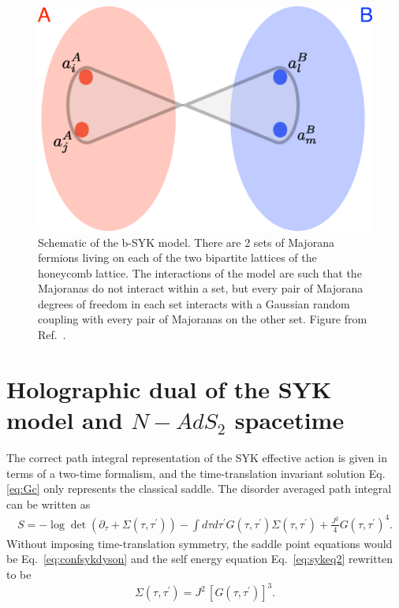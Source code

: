 \begin{figure}
    \centering
    \includegraphics[scale = 0.5]{figures/introduction/bSYK.png}
    \caption{Schematic of the b-SYK model. There are 2 sets of Majorana fermions living on each of the two bipartite lattices of the honeycomb lattice. The interactions of the model are such that the Majoranas do not interact within a set, but every pair of Majorana degrees of freedom in each set interacts with a Gaussian random coupling with every pair of Majoranas on the other set. Figure from Ref.~\cite{Fremling_2022}.}
    \label{fig:bsyk}
\end{figure}



\section{Holographic dual of the SYK model and $N-AdS_2$ spacetime}
The correct path integral representation of the SYK effective action is given in terms of a two-time formalism, and the time-translation invariant solution Eq.\eqref{eq:Gc} only represents the classical saddle. The disorder averaged path integral can be written as
\begin{align}
    S = -\log\det\left(\partial_\tau + \Sigma(\tau,\tau^\prime)\right) - \int d\tau d\tau^\prime G(\tau,\tau^\prime)\Sigma(\tau,\tau^\prime) + \frac{J^2}{4} G(\tau,\tau^\prime)^4.
\end{align}
Without imposing time-translation symmetry, the saddle point equations would be Eq.~\eqref{eq:confsykdyson} and the self energy equation Eq.~\eqref{eq:sykeq2} rewritten to be
\begin{equation}
    \Sigma(\tau,\tau^\prime) = J^2\,\left[G(\tau,\tau^\prime)\right]^3. 
    \label{eq:twotimesykeq2}
\end{equation}

